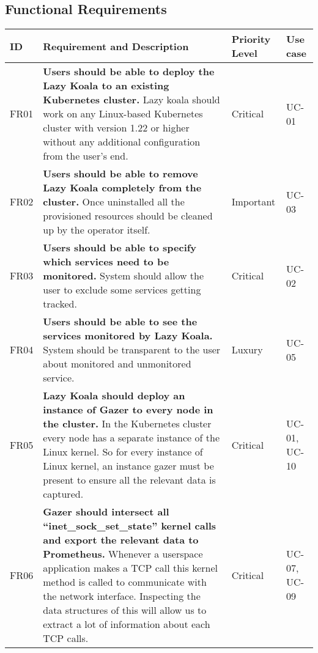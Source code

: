 
\newcommand{\functionalRequirement}[5]{
    #1 &
    \textbf{#2} \newline #3 &
    #4 &
    #5  \\ \hline
}

\subsection{Functional Requirements}

\begin{longtable}{|p{9mm}|p{107mm}|p{16mm}|p{13mm}|}
\hline
    \textbf{ID} &
    \textbf{Requirement and Description} &
    \textbf{Priority Level} &
    \textbf{Use case} \\ \hline


    \functionalRequirement
    {FR01}
    {Users should be able to deploy the Lazy Koala to an existing Kubernetes cluster.}
    {Lazy koala should work on any Linux-based Kubernetes cluster with version 1.22 or higher without any additional configuration from the user's end.}
    {Critical}
    {UC-01}
    
    \functionalRequirement
    {FR02}
    {Users should be able to remove Lazy Koala completely from the cluster.}
    {Once uninstalled all the provisioned resources should be cleaned up by the operator itself. }
    {Important}
    {UC-03}
    
        
    \functionalRequirement
    {FR03}
    {Users should be able to specify which services need to be monitored.}
    {System should allow the user to exclude some services getting tracked.}
    {Critical}
    {UC-02}
    
        
    \functionalRequirement
    {FR04}
    {Users should be able to see the services monitored by Lazy Koala.}
    {System should be transparent to the user about monitored and unmonitored service.}
    {Luxury}
    {UC-05}
    
        
    \functionalRequirement
    {FR05}
    {Lazy Koala should deploy an instance of Gazer to every node in the cluster.}
    {In the Kubernetes cluster every node has a separate instance of the Linux kernel. So for every instance of Linux kernel, an instance gazer must be present to ensure all the relevant data is captured.}
    {Critical}
    {UC-01, UC-10}
    
        
    \functionalRequirement
    {FR06}
    {Gazer should intersect all “inet\_sock\_set\_state” kernel calls and export the relevant data to Prometheus.}
    {Whenever a userspace application makes a TCP call this kernel method is called to communicate with the network interface. Inspecting the data structures of this will allow us to extract a lot of information about each TCP calls.}
    {Critical}
    {UC-07, UC-09}
    

\end{longtable}
